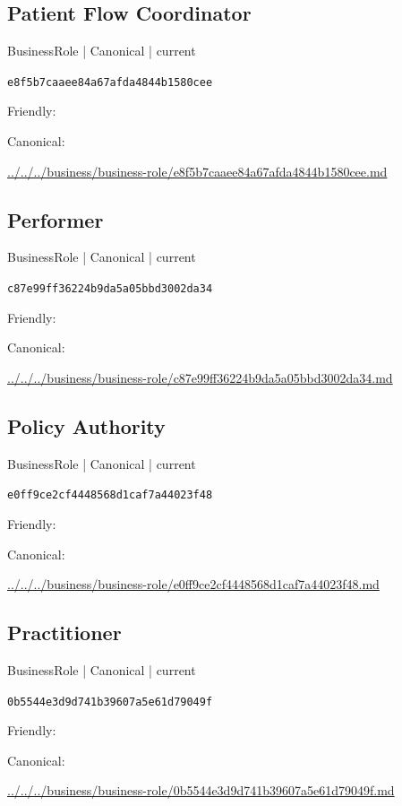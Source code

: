 \documentclass[10pt,a4paper]{article}
\begin{document}
\subsection*{Patient Flow Coordinator}
{\small BusinessRole | Canonical | current}\par
\texttt{e8f5b7caaee84a67afda4844b1580cee}\par
Friendly: \par
Canonical: \par
{\footnotesize\url{../../../business/business-role/e8f5b7caaee84a67afda4844b1580cee.md}}\par
\subsection*{Performer}
{\small BusinessRole | Canonical | current}\par
\texttt{c87e99ff36224b9da5a05bbd3002da34}\par
Friendly: \par
Canonical: \par
{\footnotesize\url{../../../business/business-role/c87e99ff36224b9da5a05bbd3002da34.md}}\par
\subsection*{Policy Authority}
{\small BusinessRole | Canonical | current}\par
\texttt{e0ff9ce2cf4448568d1caf7a44023f48}\par
Friendly: \par
Canonical: \par
{\footnotesize\url{../../../business/business-role/e0ff9ce2cf4448568d1caf7a44023f48.md}}\par
\subsection*{Practitioner}
{\small BusinessRole | Canonical | current}\par
\texttt{0b5544e3d9d741b39607a5e61d79049f}\par
Friendly: \par
Canonical: \par
{\footnotesize\url{../../../business/business-role/0b5544e3d9d741b39607a5e61d79049f.md}}\par
\end{document}

